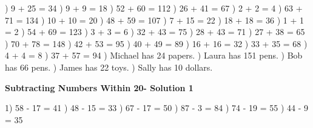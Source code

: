 \documentclass{article}%
\begin{document}
) 9 + 25 = 34%
) 9 + 9 = 18%
) 52 + 60 = 112%
) 26 + 41 = 67%
) 2 + 2 = 4%
) 63 + 71 = 134%
) 10 + 10 = 20%
) 48 + 59 = 107%
) 7 + 15 = 22%
) 18 + 18 = 36%
) 1 + 1 = 2%
) 54 + 69 = 123%
) 3 + 3 = 6%
) 32 + 43 = 75%
) 28 + 43 = 71%
) 27 + 38 = 65%
) 70 + 78 = 148%
) 42 + 53 = 95%
) 40 + 49 = 89%
) 16 + 16 = 32%
) 33 + 35 = 68%
) 4 + 4 = 8%
) 37 + 57 = 94%
) Michael has 24 papers.%
) Laura has 151 pens.%
) Bob has 66 pens.%
) James has 22 toys.%
) Sally has 10 dollars.%
\newline%
\newpage%
\large%
\begin{center}%
\textbf{Subtracting Numbers Within 20- Solution 1}%
\newline%
\end{center} \normalsize%
1) 58 {-} 17 = 41%
) 48 {-} 15 = 33%
) 67 {-} 17 = 50%
) 87 {-} 3 = 84%
) 74 {-} 19 = 55%
) 44 {-} 9 = 35%
\newline%
\end{document}
